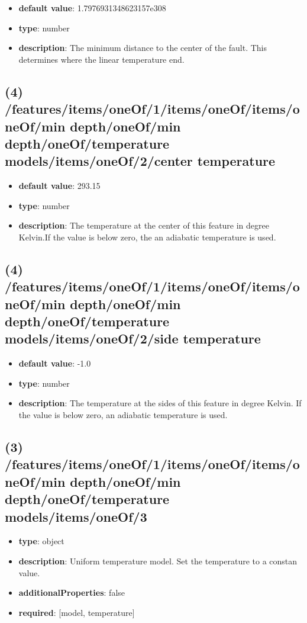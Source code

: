 \begin{itemize}[leftmargin=4em]\item {\bf default value}: 1.7976931348623157e308
\item {\bf type}: number
\item {\bf description}: The minimum distance to the center of the fault. This determines where the linear temperature end.
\end{itemize}\subsection{(4) /features/items/oneOf/1/items/oneOf/items/oneOf/min depth/oneOf/min depth/oneOf/temperature models/items/oneOf/2/center temperature}
\begin{itemize}[leftmargin=4em]\item {\bf default value}: 293.15
\item {\bf type}: number
\item {\bf description}: The temperature at the center of this feature in degree Kelvin.If the value is below zero, the an adiabatic temperature is used.
\end{itemize}\subsection{(4) /features/items/oneOf/1/items/oneOf/items/oneOf/min depth/oneOf/min depth/oneOf/temperature models/items/oneOf/2/side temperature}
\begin{itemize}[leftmargin=4em]\item {\bf default value}: -1.0
\item {\bf type}: number
\item {\bf description}: The temperature at the sides of this feature in degree Kelvin. If the value is below zero, an adiabatic temperature is used.
\end{itemize}\subsection{(3) /features/items/oneOf/1/items/oneOf/items/oneOf/min depth/oneOf/min depth/oneOf/temperature models/items/oneOf/3}
\begin{itemize}[leftmargin=3em]\item {\bf type}: object
\item {\bf description}: Uniform temperature model. Set the temperature to a constan value.
\item {\bf additionalProperties}: false
\item {\bf required}: [model, temperature]\end{itemize}
